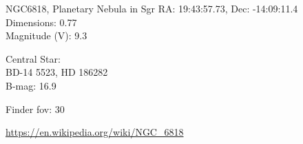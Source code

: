\begin{block}{NGC6818, Planetary Nebula in Sgr}
    RA: 19:43:57.73, Dec: -14:09:11.4 \\ 
    Dimensions: 0.77 \\ 
    Magnitude (V): 9.3

    Central Star: \\ 
      \hspace{1em}BD-14 5523, HD 186282 \\ 
      \hspace{1em}B-mag: 16.9 


    Finder fov: 30 

    \url{https://en.wikipedia.org/wiki/NGC_6818} 
\end{block}